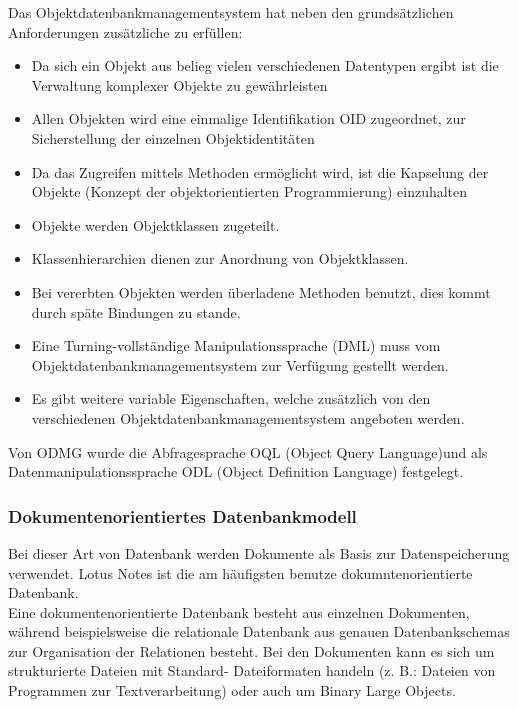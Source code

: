 \documentclass[12pt,a4paper]{report}
\begin{document}
\begin{onehalfspace}
Das Objektdatenbankmanagementsystem hat neben den grundsätzlichen Anforderungen zusätzliche zu erfüllen:
\begin{itemize}
\item Da sich ein Objekt aus belieg vielen verschiedenen Datentypen ergibt ist die Verwaltung komplexer Objekte zu gewährleisten
\item Allen Objekten wird eine einmalige Identifikation OID zugeordnet, zur Sicherstellung der einzelnen Objektidentitäten
\item Da das Zugreifen mittels Methoden ermöglicht wird, ist die Kapselung der Objekte (Konzept der objektorientierten Programmierung) einzuhalten
\item Objekte werden Objektklassen zugeteilt.
\item Klassenhierarchien dienen zur Anordnung von Objektklassen.
\item Bei vererbten Objekten werden überladene Methoden benutzt, dies kommt durch späte Bindungen zu stande.
\item Eine Turning-vollständige Manipulationssprache (DML) muss vom Objektdatenbankmanagementsystem zur Verfügung gestellt werden.
\item Es gibt weitere variable Eigenschaften, welche zusätzlich von den verschiedenen Objektdatenbankmanagementsystem angeboten werden.
\end{itemize}
Von ODMG wurde die Abfragesprache OQL (Object Query Language)und als Datenmanipulationssprache ODL (Object Definition Language) festgelegt.

\subsubsection{Dokumentenorientiertes Datenbankmodell}
Bei dieser Art von Datenbank werden Dokumente als Basis zur Datenspeicherung verwendet. Lotus Notes ist die am häufigsten benutze dokumntenorientierte Datenbank.\\

Eine dokumentenorientierte Datenbank besteht aus einzelnen Dokumenten, während beispielsweise die relationale Datenbank aus genauen Datenbankschemas zur Organisation der Relationen besteht. Bei den Dokumenten kann es sich um strukturierte Dateien mit Standard- Dateiformaten handeln (z. B.: Dateien von Programmen zur Textverarbeitung) oder auch um Binary Large Objects.\\


\end{onehalfspace}
\end{document}
